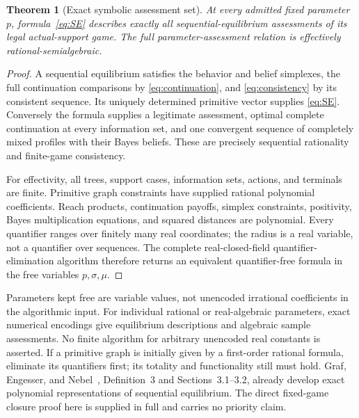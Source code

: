 \documentclass[11pt,a4paper]{article}
\numberwithin{equation}{section}
\newtheorem{theorem}{Theorem}
\theoremstyle{definition}
\begin{document}
\begin{theorem}[Exact symbolic assessment set]\label{thm:SE}
At every admitted fixed parameter \(p\), formula~\eqref{eq:SE} describes
exactly all sequential-equilibrium assessments of its legal
actual-support game. The full parameter-assessment relation is
effectively rational-semialgebraic.
\end{theorem}
\begin{proof}
A sequential equilibrium satisfies the behavior and belief simplexes,
the full continuation comparisons by \eqref{eq:continuation}, and
\eqref{eq:consistency} by its consistent sequence.
Its uniquely determined primitive vector supplies \eqref{eq:SE}.
Conversely the formula supplies a legitimate assessment, optimal
complete continuation at every information set, and one convergent
sequence of completely mixed profiles with their Bayes beliefs.
These are precisely sequential rationality and finite-game consistency.

For effectivity, all trees, support cases, information sets, actions,
and terminals are finite. Primitive graph constraints have supplied
rational polynomial coefficients.
Reach products, continuation payoffs, simplex constraints, positivity,
Bayes multiplication equations, and squared distances are polynomial.
Every quantifier ranges over finitely many real coordinates; the radius
is a real variable, not a quantifier over sequences.
The complete real-closed-field quantifier-elimination algorithm
therefore returns an equivalent quantifier-free formula in the free
variables \(p,\sigma,\mu\).
\end{proof}

Parameters kept free are variable values, not unencoded irrational
coefficients in the algorithmic input.
For individual rational or real-algebraic parameters, exact numerical
encodings give equilibrium descriptions and algebraic sample
assessments. No finite algorithm for arbitrary unencoded real constants
is asserted.
If a primitive graph is initially given by a first-order rational
formula, eliminate its quantifiers first; its totality and functionality
still must hold.
Graf, Engesser, and Nebel~\cite{GEN2024}, Definition~3 and
Sections~3.1--3.2, already develop exact polynomial representations
of sequential equilibrium. The direct fixed-game closure proof here
is supplied in full and carries no priority claim.
\end{document}
